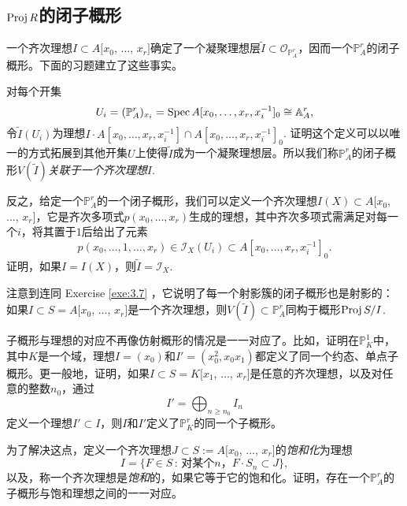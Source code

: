 \subsection{\texorpdfstring{$\operatorname{Proj} R$}{Proj R}的闭子概形}\label{s:3.2.2}

一个齐次理想$I\subset A[x_0$, $\dots$, $x_r]$确定了一个凝聚理想层$\tilde I\subset \mathscr O_{\mathbb P_A^r}$，因而一个$\mathbb P_A^r$的闭子概形。下面的习题建立了这些事实。

\begin{exe}\label{exe:3.13}
对每个开集
\[
	U_i=(\mathbb P_A^r)_{x_i}=\operatorname{Spec} A[x_0,\dots,x_r,x_i^{-1}]_0\cong \mathbb A_A^r,
\]
令$\tilde I(U_i)$为理想$I\cdot A[x_0,\dots,x_r,x_i^{-1}]\cap A[x_0,\dots,x_r,x_i^{-1}]_0$. 证明这个定义可以以唯一的方式拓展到其他开集$U$上使得$\tilde{I}$成为一个凝聚理想层。所以我们称$\mathbb P_A^r$的闭子概形$V(\tilde{I})$\textit{关联于一个齐次理想$I$}.
\end{exe}

\begin{exe}\label{exe:3.14}
反之，给定一个$\mathbb P_A^r$的一个闭子概形，我们可以定义一个齐次理想$I(X)\subset A[x_0$, $\dots$, $x_r]$，它是齐次多项式$p(x_0,\dots,x_r)$生成的理想，其中齐次多项式需满足对每一个$i$，将其置于$1$后给出了元素
\[
	p(x_0,\dots,1,\dots,x_r)\in \mathscr I_X(U_i)\subset A[x_0,\dots,x_r,x_i^{-1}]_0.
\]
证明，如果$I=I(X)$，则$\tilde I=\mathscr I_X$.
\end{exe}

注意到连同 Exercise \ref{exe:3.7} ，它说明了每一个射影簇的闭子概形也是射影的：如果$I\subset S=A[x_0$, $\dots$, $x_r]$是一个齐次理想，则$V(\tilde{I})\subset \mathbb P^r_A$同构于概形$\operatorname{Proj} S/I$.

\begin{exe}\label{exe:3.15}
子概形与理想的对应不再像仿射概形的情况是一一对应了。比如，证明在$\mathbb P_K^1$中，其中$K$是一个域，理想$I=(x_0)$和$I'=(x_0^2,x_0x_1)$都定义了同一个约态、单点子概形。更一般地，证明，如果$I\subset S=K[x_1$, $\dots$, $x_r]$是任意的齐次理想，以及对任意的整数$n_0$，通过
\[
	I'=\bigoplus_{n\geq n_0}I_n
\]
定义一个理想$I'\subset I$，则$I$和$I'$定义了$\mathbb P_K^r$的同一个子概形。
\end{exe}

\begin{exe}\label{exe:3.16}
为了解决这点，定义一个齐次理想$J\subset S:=A[x_0$, $\dots$, $x_r]$的\textit{饱和化}为理想
\[
	I=\{F\in S\,:\, \text{对某个$n$，$F\cdot S_n\subset J$}\},
\]
以及，称一个齐次理想是\textit{饱和}的，如果它等于它的饱和化。证明，存在一个$\mathbb P_A^r$的子概形与饱和理想之间的一一对应。
\end{exe}

